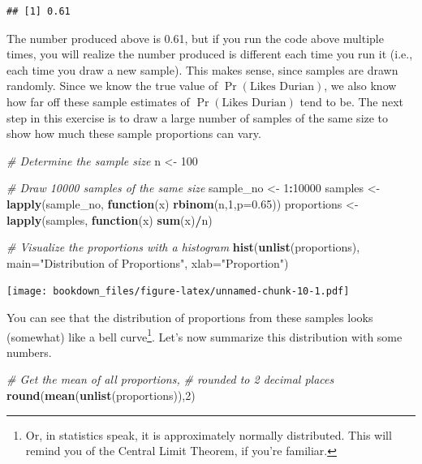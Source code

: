 \documentclass[openany]{book}
\newenvironment{Shaded}{\begin{snugshade}}{\end{snugshade}}
\newcommand{\KeywordTok}[1]{\textcolor[rgb]{0.13,0.29,0.53}{\textbf{#1}}}
\newcommand{\DataTypeTok}[1]{\textcolor[rgb]{0.13,0.29,0.53}{#1}}
\newcommand{\DecValTok}[1]{\textcolor[rgb]{0.00,0.00,0.81}{#1}}
\newcommand{\FloatTok}[1]{\textcolor[rgb]{0.00,0.00,0.81}{#1}}
\newcommand{\StringTok}[1]{\textcolor[rgb]{0.31,0.60,0.02}{#1}}
\newcommand{\CommentTok}[1]{\textcolor[rgb]{0.56,0.35,0.01}{\textit{#1}}}
\newcommand{\ControlFlowTok}[1]{\textcolor[rgb]{0.13,0.29,0.53}{\textbf{#1}}}
\newcommand{\OperatorTok}[1]{\textcolor[rgb]{0.81,0.36,0.00}{\textbf{#1}}}
\newcommand{\NormalTok}[1]{#1}
\let\rmarkdownfootnote\footnote%
\def\footnote{\protect\rmarkdownfootnote}
\begin{document}
\begin{verbatim}
## [1] 0.61
\end{verbatim}

The number produced above is 0.61, but if you run the code above
multiple times, you will realize the number produced is different each
time you run it (i.e., each time you draw a new sample). This makes
sense, since samples are drawn randomly. Since we know the true value of
\(\Pr(\text{Likes Durian})\), we also know how far off these sample
estimates of \(\Pr(\text{Likes Durian})\) tend to be. The next step in
this exercise is to draw a large number of samples of the same size to
show how much these sample proportions can vary.

\begin{Shaded}
\begin{Highlighting}[]
\CommentTok{# Determine the sample size}
\NormalTok{n <-}\StringTok{ }\DecValTok{100}

\CommentTok{# Draw 10000 samples of the same size}
\NormalTok{sample_no <-}\StringTok{ }\DecValTok{1}\OperatorTok{:}\DecValTok{10000}
\NormalTok{samples <-}\StringTok{ }\KeywordTok{lapply}\NormalTok{(sample_no, }\ControlFlowTok{function}\NormalTok{(x) }\KeywordTok{rbinom}\NormalTok{(n,}\DecValTok{1}\NormalTok{,}\DataTypeTok{p=}\FloatTok{0.65}\NormalTok{))}
\NormalTok{proportions <-}\StringTok{ }\KeywordTok{lapply}\NormalTok{(samples, }\ControlFlowTok{function}\NormalTok{(x) }\KeywordTok{sum}\NormalTok{(x)}\OperatorTok{/}\NormalTok{n)}

\CommentTok{# Visualize the proportions with a histogram}
\KeywordTok{hist}\NormalTok{(}\KeywordTok{unlist}\NormalTok{(proportions), }
     \DataTypeTok{main=}\StringTok{"Distribution of Proportions"}\NormalTok{, }
     \DataTypeTok{xlab=}\StringTok{"Proportion"}\NormalTok{)}
\end{Highlighting}
\end{Shaded}

\texttt{[image: bookdown\_files/figure-latex/unnamed-chunk-10-1.pdf]}

You can see that the distribution of proportions from these samples
looks (somewhat) like a bell curve\footnote{Or, in statistics speak, it
  is approximately normally distributed. This will remind you of the
  Central Limit Theorem, if you're familiar.}. Let's now summarize this
distribution with some numbers.

\begin{Shaded}
\begin{Highlighting}[]
\CommentTok{# Get the mean of all proportions, }
\CommentTok{#  rounded to 2 decimal places}
\KeywordTok{round}\NormalTok{(}\KeywordTok{mean}\NormalTok{(}\KeywordTok{unlist}\NormalTok{(proportions)),}\DecValTok{2}\NormalTok{)}
\end{Highlighting}
\end{Shaded}
\end{document}
